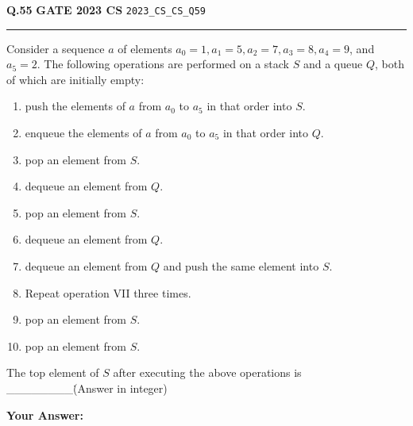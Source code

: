 \documentclass[a4paper,10pt]{article}
\begin{document}
\begin{tcolorbox}[
    blanker,
    sidebyside,
    sidebyside align=top,
    lefthand width=0.55\textwidth,
    top=4pt, bottom=4pt, left=0pt, right=0pt,
    middle=16pt,
    underlay={
        \draw[dashed, black!80, line width=0.8pt, dash pattern=on 4pt off 3pt]
            ([xshift=0.55\textwidth+8pt]frame.north west) --
            ([xshift=0.55\textwidth+8pt]frame.south west);
    }
]
\textbf{Q.55}  \hfill {\footnotesize\textbf{GATE 2023 CS} \quad \tiny\texttt{2023\_CS\_CS\_Q59}}
\vspace{2pt}\hrule height 0.3pt\vspace{4pt}

Consider a sequence $a$ of elements $a_0 = 1, a_1 = 5, a_2 = 7, a_3 = 8, a_4 = 9$, and $a_5 = 2$. The following operations are performed on a stack $S$ and a queue $Q$, both of which are initially empty:
\begin{enumerate}[label=\Roman*.,itemsep=0pt,topsep=2pt]
\item push the elements of $a$ from $a_0$ to $a_5$ in that order into $S$.
\item enqueue the elements of $a$ from $a_0$ to $a_5$ in that order into $Q$.
\item pop an element from $S$.
\item dequeue an element from $Q$.
\item pop an element from $S$.
\item dequeue an element from $Q$.
\item dequeue an element from $Q$ and push the same element into $S$.
\item Repeat operation VII three times.
\item pop an element from $S$.
\item pop an element from $S$.
\end{enumerate}
The top element of $S$ after executing the above operations is \_\_\_\_\_\_\_\_\. (Answer in integer)

\par\vspace{6pt}\noindent\textbf{Your Answer:} \fbox{\rule{0pt}{1.3ex}\hspace{3cm}}

\tcblower


\end{tcolorbox}
\end{document}
